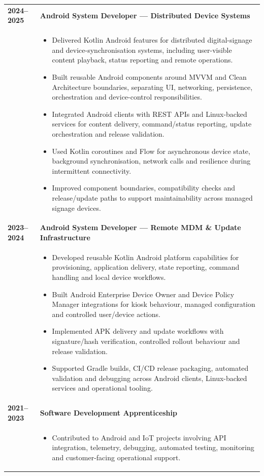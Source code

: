 \documentclass[11pt,a4paper]{article}
\begin{document}
\begin{tabularx}{\textwidth}{>{\raggedleft\arraybackslash}p{2.4cm} !{\color{timelinegray}\vrule width 0.8pt} >{\raggedright\arraybackslash}X}
\textbf{\color{timelineblue}2024--2025} &
\textbf{Android System Developer --- Distributed Device Systems}\\
& {\footnotesize\color{timelinegray}
\begin{itemize}
    \item Delivered Kotlin Android features for distributed digital-signage and device-synchronisation systems, including user-visible content playback, status reporting and remote operations.
    \item Built reusable Android components around MVVM and Clean Architecture boundaries, separating UI, networking, persistence, orchestration and device-control responsibilities.
    \item Integrated Android clients with REST APIs and Linux-backed services for content delivery, command/status reporting, update orchestration and release validation.
    \item Used Kotlin coroutines and Flow for asynchronous device state, background synchronisation, network calls and resilience during intermittent connectivity.
    \item Improved component boundaries, compatibility checks and release/update paths to support maintainability across managed signage devices.
\end{itemize}} \\[2pt]

\textbf{\color{timelineblue}2023--2024} &
\textbf{Android System Developer --- Remote MDM \& Update Infrastructure}\\
& {\footnotesize\color{timelinegray}
\begin{itemize}
    \item Developed reusable Kotlin Android platform capabilities for provisioning, application delivery, state reporting, command handling and local device workflows.
    \item Built Android Enterprise Device Owner and Device Policy Manager integrations for kiosk behaviour, managed configuration and controlled user/device actions.
    \item Implemented APK delivery and update workflows with signature/hash verification, controlled rollout behaviour and release validation.
    \item Supported Gradle builds, CI/CD release packaging, automated validation and debugging across Android clients, Linux-backed services and operational tooling.
\end{itemize}} \\[2pt]

\textbf{\color{timelineblue}2021--2023} &
\textbf{Software Development Apprenticeship}\\
& {\scriptsize\color{timelinegray}
\begin{itemize}
    \item Contributed to Android and IoT projects involving API integration, telemetry, debugging, automated testing, monitoring and customer-facing operational support.
\end{itemize}}
\end{tabularx}
\end{document}
